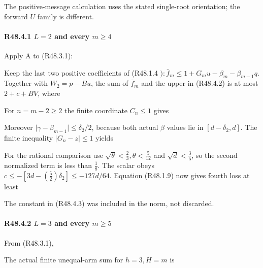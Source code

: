 The positive-message calculation uses the stated single-root orientation; the forward \(U\) family is different.

\paragraph{R48.4.1 \(L=2\) and every \(m\ge 4\)}

Apply A to (R48.3.1):


Keep the last two positive coefficients of (R48.1.4 \(): \bar f_m \le  1+G_m u-\beta_m-\beta_{m-1}q\). Together with \(W_{2}=p-Bu\), the sum of \(\bar f_m\) and the upper in (R48.4.2) is at most \(2+c+BV\), where


For \(n=m-2\ge 2\) the finite coordinate \(C_n\le 1\) gives


Moreover \(\lvert \gamma-\beta_{m-1}\rvert \le \delta_2/2\), because both actual \(\beta\) values lie in \([d-\delta_2,\allowbreak \allowbreak d]\). The finite inequality \(\lvert G_n-z\rvert \le 1\) yields


For the rational comparison use \(\sqrt{\theta}<\frac{2}{3},\allowbreak \allowbreak  \theta<\frac{5}{12}\) and \(\sqrt{d}<\frac{3}{5}\), so the second normalized term is less than \(\frac{1}{8}\). The scalar obeys \(c\le -[3d-(\frac{5}{2})\delta_2]\le -127d/64\). Equation (R48.1.9) now gives fourth loss at least


The constant in (R48.4.3) was included in the norm, not discarded.

\paragraph{R48.4.2 \(L=3\) and every \(m\ge 5\)}

From (R48.3.1),


The actual finite unequal-arm sum for \(h=3,\allowbreak \allowbreak  H=m\) is

